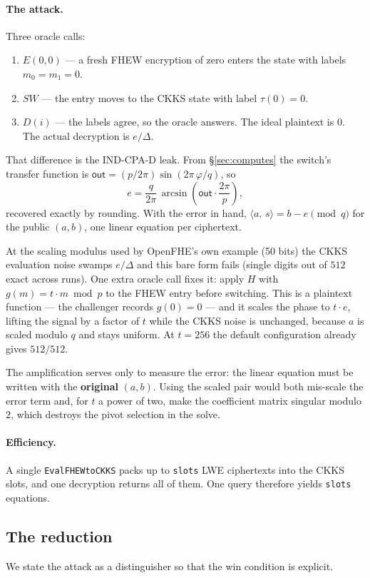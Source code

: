 \documentclass[11pt]{article}
\newcommand{\inner}[2]{\langle #1,\, #2\rangle}
\newcommand{\out}{\mathsf{out}}
\newcommand{\code}[1]{\texttt{#1}}
\begin{document}
\paragraph{The attack.}
Three oracle calls:
\begin{enumerate}
  \item $E(0, 0)$ --- a fresh FHEW encryption of zero enters the state with labels $m_0 = m_1 = 0$.
  \item $\mathit{SW}$ --- the entry moves to the CKKS state with label $\tau(0) = 0$.
  \item $D(i)$ --- the labels agree, so the oracle answers. The ideal plaintext is $0$. The actual
    decryption is $e/\Delta$.
\end{enumerate}
That difference is the IND-CPA-D leak. From \S\ref{sec:computes} the
switch's transfer function is $\out = (p/2\pi)\sin(2\pi\,\varphi/q)$, so
\[
  e = \frac{q}{2\pi}\,\arcsin\!\left(\out \cdot \frac{2\pi}{p}\right),
\]
recovered exactly by rounding. With the error in hand, $\inner{a}{s} = b - e \pmod q$ for the
public $(a, b)$, one linear equation per ciphertext.

At the scaling modulus used by OpenFHE's own example (50 bits) the CKKS evaluation noise swamps
$e/\Delta$ and this bare form fails (single digits out of $512$ exact across runs). One extra
oracle call fixes it: apply $H$ with $g(m) = t\cdot m \bmod p$ to the FHEW entry before switching.
This is a plaintext function --- the challenger records $g(0) = 0$ --- and it scales the
phase to $t\cdot e$, lifting the signal by a factor of $t$ while the CKKS noise is unchanged,
because $a$ is scaled modulo $q$ and stays uniform. At $t = 256$ the default configuration already
gives $512/512$.

The amplification serves only to measure the error: the linear equation must be
written with the \textbf{original} $(a, b)$. Using the scaled pair would both mis-scale the error
term and, for $t$ a power of two, make the coefficient matrix singular modulo $2$, which destroys
the pivot selection in the solve.

\paragraph{Efficiency.}
A single \code{EvalFHEWtoCKKS} packs up to \code{slots} LWE ciphertexts into the CKKS slots, and
one decryption returns all of them. One query therefore yields \code{slots} equations.

\subsection{The reduction}
We state the attack as a distinguisher so that the win condition is explicit.
\end{document}

